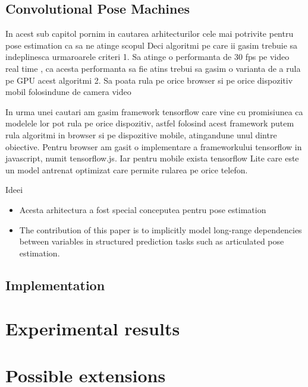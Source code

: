 \subsection{Convolutional Pose Machines \cite{DBLP:journals/corr/WeiRKS16}}
 In acest sub capitol pornim in cautarea arhitecturilor cele mai potrivite pentru pose estimation ca sa ne atinge scopul
 Deci algoritmi pe care ii gasim trebuie sa indeplinesca urmaroarele criteri
 1. Sa atinge o performanta de 30 fps pe video real time , ca acesta performanta sa fie atins trebui sa gasim o varianta de a rula pe GPU acest algoritmi
 2. Sa poata rula pe orice browser si pe orice dispozitiv mobil folosindune de camera video 
 

 
 In urma unei cautari am gasim framework tensorflow care vine cu promisiunea ca modelele lor pot 
 rula pe orice dispozitiv, astfel folosind acest framework putem rula algoritmi in browser si pe dispozitive mobile, atingandune unul dintre obiective.
 Pentru browser am gasit o implementare a frameworkului tensorflow in javascript, numit tensorflow.js.
Iar pentru mobile exista tensorflow Lite care este un model antrenat optimizat care permite rularea pe orice telefon.
 

 


Ideei \cite{DBLP:journals/corr/WeiRKS16}
\begin{itemize}
    \item Acesta arhitectura a fost special conceputea pentru pose estimation
    \item The contribution of this paper is to implicitly model long-range dependencies between variables in structured prediction tasks such as articulated pose estimation.
\end{itemize}
\subsection{Implementation}


\section{Experimental results}

\section{Possible extensions}